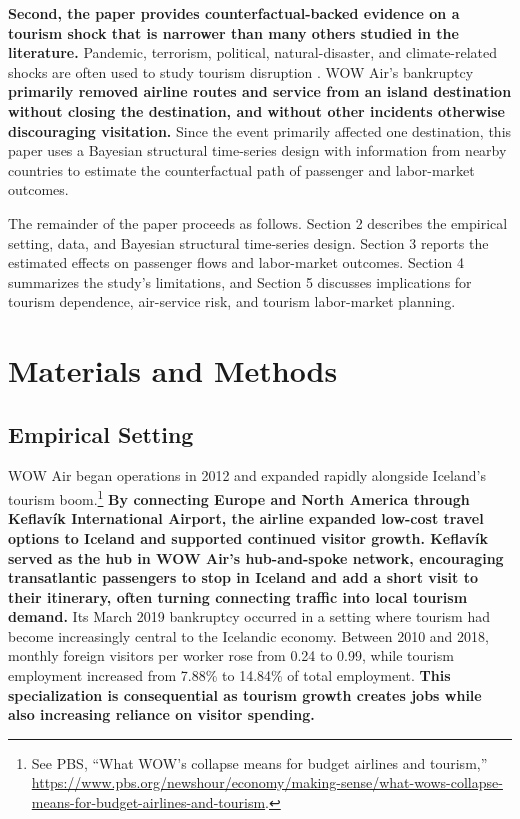 \documentclass[12pt]{article}
\begin{document}
\textbf{Second, the paper provides counterfactual-backed evidence on a tourism shock that is narrower than many others studied in the literature.} Pandemic, terrorism, political, natural-disaster, and climate-related shocks are often used to study tourism disruption \citep{saleh_2011_do,yucel_2020_are,morakabati_2019_a,duro_2021_covid19,sun_2021_vulnerable,sun_2022_job_vulnerability,mccarroll_2024_resilience}. WOW Air's bankruptcy \textbf{primarily removed airline routes and service from an island destination without closing the destination, and without other incidents otherwise discouraging visitation.} Since the event primarily affected one destination, this paper uses a Bayesian structural time-series design with information from nearby countries to estimate the counterfactual path of passenger and labor-market outcomes.

The remainder of the paper proceeds as follows. Section 2 describes the empirical setting, data, and Bayesian structural time-series design. Section 3 reports the estimated effects on passenger flows and labor-market outcomes. Section 4 summarizes the study's limitations, and Section 5 discusses implications for tourism dependence, air-service risk, and tourism labor-market planning.

\section{Materials and Methods}\label{sec:methods}

\subsection{Empirical Setting}\label{sec:empirical_setting}

WOW Air began operations in 2012 and expanded rapidly alongside Iceland's tourism boom.\footnote{See PBS, ``What WOW's collapse means for budget airlines and tourism,'' \url{https://www.pbs.org/newshour/economy/making-sense/what-wows-collapse-means-for-budget-airlines-and-tourism}.} \textbf{By connecting Europe and North America through Keflavík International Airport, the airline expanded low-cost travel options to Iceland and supported continued visitor growth. Keflavík served as the hub in WOW Air’s hub-and-spoke network, encouraging transatlantic passengers to stop in Iceland and add a short visit to their itinerary, often turning connecting traffic into local tourism demand.} Its March 2019 bankruptcy occurred in a setting where tourism had become increasingly central to the Icelandic economy. Between 2010 and 2018, monthly foreign visitors per worker rose from 0.24 to 0.99, while tourism employment increased from 7.88\% to 14.84\% of total employment. \textbf{This specialization is consequential as tourism growth creates jobs while also increasing reliance on visitor spending.}
\end{document}
